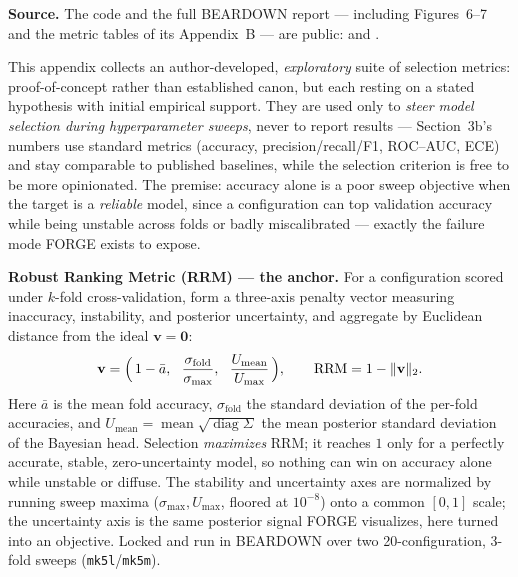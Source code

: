 \noindent\textbf{Source.} The code and the full BEARDOWN report --- including Figures~6--7 and the metric tables of its Appendix~B --- are public:  and .

\smallskip
This appendix collects an author-developed, \emph{exploratory} suite of selection metrics: proof-of-concept rather than established canon, but each resting on a stated hypothesis with initial empirical support. They are used only to \emph{steer model selection during hyperparameter sweeps}, never to report results --- Section~3b's numbers use standard metrics (accuracy, precision/recall/F1, ROC--AUC, ECE) and stay comparable to published baselines, while the selection criterion is free to be more opinionated. The premise: accuracy alone is a poor sweep objective when the target is a \emph{reliable} model, since a configuration can top validation accuracy while being unstable across folds or badly miscalibrated --- exactly the failure mode FORGE exists to expose.

\smallskip
\noindent\textbf{Robust Ranking Metric (RRM) --- the anchor.} For a configuration scored under $k$-fold cross-validation, form a three-axis penalty vector measuring inaccuracy, instability, and posterior uncertainty, and aggregate by Euclidean distance from the ideal $\mathbf{v}=\mathbf{0}$:
\[
  \mathbf{v}=\Bigl(\,1-\bar{a},\ \ \frac{\sigma_{\mathrm{fold}}}{\sigma_{\max}},\ \ \frac{U_{\mathrm{mean}}}{U_{\max}}\,\Bigr),
  \qquad
  \mathrm{RRM} = 1-\lVert\mathbf{v}\rVert_2 .
\]
Here $\bar{a}$ is the mean fold accuracy, $\sigma_{\mathrm{fold}}$ the standard deviation of the per-fold accuracies, and $U_{\mathrm{mean}}=\operatorname{mean}\sqrt{\operatorname{diag}\Sigma}$ the mean posterior standard deviation of the Bayesian head. Selection \emph{maximizes} RRM; it reaches $1$ only for a perfectly accurate, stable, zero-uncertainty model, so nothing can win on accuracy alone while unstable or diffuse. The stability and uncertainty axes are normalized by running sweep maxima ($\sigma_{\max},U_{\max}$, floored at $10^{-8}$) onto a common $[0,1]$ scale; the uncertainty axis is the same posterior signal FORGE visualizes, here turned into an objective. Locked and run in BEARDOWN over two 20-configuration, 3-fold sweeps (\texttt{mk5l}/\texttt{mk5m}).

